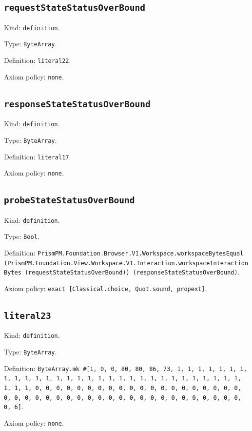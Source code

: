 \documentclass[11pt]{article}
\begin{document}
\subsection*{\texttt{requestStateStatusOverBound}}
\noindent Kind: \texttt{definition}.\par
\noindent Type: \texttt{ByteArray}.\par
\noindent Definition: \texttt{literal22}.\par
\noindent Axiom policy: \texttt{none}.\par
\subsection*{\texttt{responseStateStatusOverBound}}
\noindent Kind: \texttt{definition}.\par
\noindent Type: \texttt{ByteArray}.\par
\noindent Definition: \texttt{literal17}.\par
\noindent Axiom policy: \texttt{none}.\par
\subsection*{\texttt{probeStateStatusOverBound}}
\noindent Kind: \texttt{definition}.\par
\noindent Type: \texttt{Bool}.\par
\noindent Definition: \texttt{PrismPM.Foundation.Browser.V1.Workspace.workspaceBytesEqual (PrismPM.Foundation.View.Workspace.V1.Interaction.workspaceInteractionBytes (requestStateStatusOverBound)) (responseStateStatusOverBound)}.\par
\noindent Axiom policy: \texttt{exact [Classical.choice, Quot.sound, propext]}.\par
\subsection*{\texttt{literal23}}
\noindent Kind: \texttt{definition}.\par
\noindent Type: \texttt{ByteArray}.\par
\noindent Definition: \texttt{ByteArray.mk \#[1, 0, 0, 80, 80, 86, 73, 1, 1, 1, 1, 1, 1, 1, 1, 1, 1, 1, 1, 1, 1, 1, 1, 1, 1, 1, 1, 1, 1, 1, 1, 1, 1, 1, 1, 1, 1, 1, 1, 1, 0, 0, 0, 0, 0, 0, 0, 0, 0, 0, 0, 0, 0, 0, 0, 0, 0, 0, 0, 0, 0, 0, 0, 0, 0, 0, 0, 0, 0, 0, 0, 0, 0, 0, 0, 0, 0, 0, 0, 0, 0, 0, 0, 0, 6]}.\par
\noindent Axiom policy: \texttt{none}.\par
\end{document}
